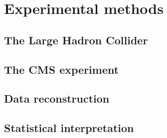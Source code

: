 \chapter{Experimental methods}
\label{ch:methods}

\section{The Large Hadron Collider}

\section{The CMS experiment}

\section{Data reconstruction}

\section{Statistical interpretation}

